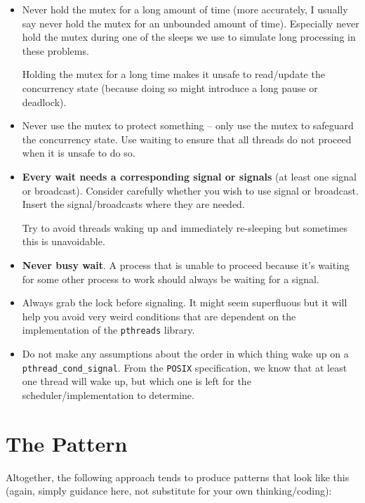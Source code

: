 \documentclass[11pt,usletter]{article}
\begin{document}
\begin{itemize}
  \item  Never hold the mutex for a long amount of time (more accurately, I
    usually say never hold the mutex for an unbounded amount of time).
    Especially never hold the mutex during one of the sleeps we use to simulate
    long processing in these problems. 

    \noindent Holding the mutex for a long time makes it unsafe to read/update
    the concurrency state (because doing so might introduce a long pause or
    deadlock).

  \item  Never use the mutex to protect something – only use the mutex to
    safeguard the concurrency state.  Use waiting to ensure that all threads do
    not proceed when it is unsafe to do so. 

  \item  {\bf Every wait needs a corresponding signal or signals} (at least one
    signal or broadcast).  Consider carefully whether you wish to use signal or
    broadcast. Insert the signal/broadcasts where they are needed. 

    \noindent Try to avoid threads waking up and immediately re-sleeping but
    sometimes this is unavoidable. 

  \item  {\bf Never busy wait}.  A process that is unable to proceed because
    it’s waiting for some other process to work should always be waiting for a
    signal.

  \item Always grab the lock before signaling. It might seem superfluous but it
    will help you avoid very weird conditions that are dependent on the
    implementation of the {\tt pthreads} library.

  \item  Do not make any assumptions about the order in which thing wake up on
    a {\tt pthread\_cond\_signal}. From the {\tt POSIX} specification, we know
    that at least one thread will wake up, but which one is left for the
    scheduler/implementation to determine.
\end{itemize}

\section{The Pattern}

Altogether, the following approach tends to produce patterns that look like
this (again, simply guidance here, not substitute for your own
thinking/coding):
\end{document}
